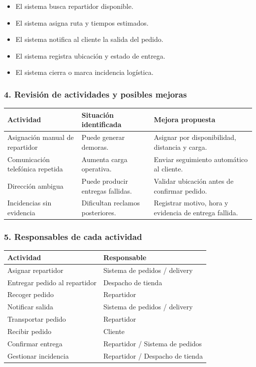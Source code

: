 \documentclass[a4paper,12pt]{article}
\begin{document}
\begin{itemize}
    \item El sistema busca repartidor disponible.
    \item El sistema asigna ruta y tiempos estimados.
    \item El sistema notifica al cliente la salida del pedido.
    \item El sistema registra ubicación y estado de entrega.
    \item El sistema cierra o marca incidencia logística.
\end{itemize}

\subsubsection*{4. Revisión de actividades y posibles mejoras}

\begin{longtable}{P{5cm} P{4cm} P{5cm}}
\toprule
\textbf{Actividad} & \textbf{Situación identificada} & \textbf{Mejora propuesta} \\
\midrule
Asignación manual de repartidor & Puede generar demoras. & Asignar por disponibilidad, distancia y carga. \\
Comunicación telefónica repetida & Aumenta carga operativa. & Enviar seguimiento automático al cliente. \\
Dirección ambigua & Puede producir entregas fallidas. & Validar ubicación antes de confirmar pedido. \\
Incidencias sin evidencia & Dificultan reclamos posteriores. & Registrar motivo, hora y evidencia de entrega fallida. \\
\bottomrule
\end{longtable}

\subsubsection*{5. Responsables de cada actividad}

\begin{longtable}{P{7cm} P{7cm}}
\toprule
\textbf{Actividad} & \textbf{Responsable} \\
\midrule
Asignar repartidor & Sistema de pedidos / delivery \\
Entregar pedido al repartidor & Despacho de tienda \\
Recoger pedido & Repartidor \\
Notificar salida & Sistema de pedidos / delivery \\
Transportar pedido & Repartidor \\
Recibir pedido & Cliente \\
Confirmar entrega & Repartidor / Sistema de pedidos \\
Gestionar incidencia & Repartidor / Despacho de tienda \\
\bottomrule
\end{longtable}
\end{document}
